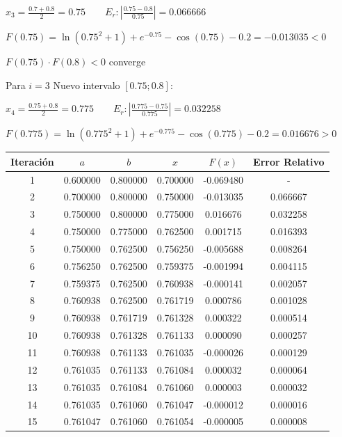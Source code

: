 \documentclass[12pt]{article}
\begin{document}
$x_3=\frac{0.7+0.8}{2}=0.75 \qquad E_r:\left|\frac{0.75-0.8}{0.75}\right|=0.066666$

$F(0.75)=\ln(0.75^2+1)+e^{-0.75}-\cos(0.75)-0.2=-0.013035<0$

$F(0.75)\cdot F(0.8)<0$ converge

\vspace{0.5cm}
Para $i=3$ Nuevo intervalo $[0.75;0.8]$:

$x_4=\frac{0.75+0.8}{2}=0.775 \qquad E_r:\left|\frac{0.775-0.75}{0.775}\right|=0.032258$

$F(0.775)=\ln(0.775^2+1)+e^{-0.775}-\cos(0.775)-0.2=0.016676>0$

\begin{center}
	\begin{tabular}{|c|c|c|c|c|c|}
		\hline
		Iteración & $a$      & $b$      & $x$      & $F(x)$     & Error Relativo \\ \hline
		1         & 0.600000 & 0.800000 & 0.700000 & -0.069480  & -              \\ \hline
		2         & 0.700000 & 0.800000 & 0.750000 & -0.013035  & 0.066667       \\ \hline
		3         & 0.750000 & 0.800000 & 0.775000 & 0.016676   & 0.032258       \\ \hline
		4         & 0.750000 & 0.775000 & 0.762500 & 0.001715   & 0.016393       \\ \hline
		5         & 0.750000 & 0.762500 & 0.756250 & -0.005688  & 0.008264       \\ \hline
		6         & 0.756250 & 0.762500 & 0.759375 & -0.001994  & 0.004115       \\ \hline
		7         & 0.759375 & 0.762500 & 0.760938 & -0.000141  & 0.002057       \\ \hline
		8         & 0.760938 & 0.762500 & 0.761719 & 0.000786   & 0.001028       \\ \hline
		9         & 0.760938 & 0.761719 & 0.761328 & 0.000322   & 0.000514       \\ \hline
		10        & 0.760938 & 0.761328 & 0.761133 & 0.000090   & 0.000257       \\ \hline
		11        & 0.760938 & 0.761133 & 0.761035 & -0.000026  & 0.000129       \\ \hline
		12        & 0.761035 & 0.761133 & 0.761084 & 0.000032   & 0.000064       \\ \hline
		13        & 0.761035 & 0.761084 & 0.761060 & 0.000003   & 0.000032       \\ \hline
		14        & 0.761035 & 0.761060 & 0.761047 & -0.000012  & 0.000016       \\ \hline
		15        & 0.761047 & 0.761060 & 0.761054 & -0.000005  & 0.000008       \\ \hline
	\end{tabular}
\end{center}
\end{document}
